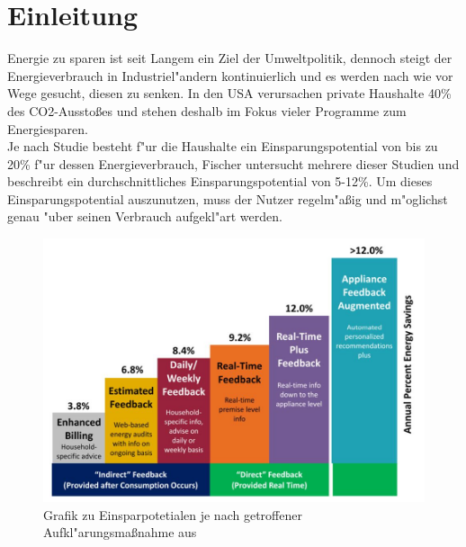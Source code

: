 \section{Einleitung}
\label{Einleitung}

	Energie zu sparen ist seit Langem ein Ziel der Umweltpolitik, dennoch steigt der Energieverbrauch in Industriel"andern kontinuierlich und es werden nach wie vor Wege gesucht, diesen zu senken. 
	In den USA verursachen private Haushalte 40\% des CO2-Aussto{\ss}es \cite{vandenbergh2008individual} und stehen deshalb im Fokus vieler Programme zum Energiesparen. \\
	Je nach Studie besteht f"ur die Haushalte ein Einsparungspotential von bis zu 20\% \cite{armel2013disaggregation} f"ur dessen Energieverbrauch, Fischer \cite{fischer2008feedback} untersucht mehrere dieser Studien und beschreibt ein durchschnittliches Einsparungspotential von 5-12\%. 
	Um dieses Einsparungspotential auszunutzen, muss der Nutzer regelm"a{\ss}ig und m"oglichst genau "uber seinen Verbrauch aufgekl"art werden. 	%
	\begin{figure}[ht]
\includegraphics[height=0.7\textwidth]{1_Grafiken/fig1armel.jpg}
	\caption[Einsparungpotentiale nach Ma{\ss}nahme]{Grafik zu Einsparpotetialen je nach getroffener Aufkl"arungsma{\ss}nahme aus \cite{armel2013disaggregation}}
\label{potentiale}
\end{figure}

